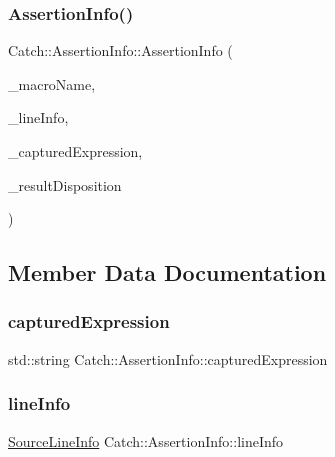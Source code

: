 \subsubsection{\texorpdfstring{Assertion\+Info()}{AssertionInfo()}\hspace{0.1cm}{\footnotesize\ttfamily [2/2]}}
{\footnotesize\ttfamily Catch\+::\+Assertion\+Info\+::\+Assertion\+Info (\begin{DoxyParamCaption}\item[{std\+::string const \&}]{\+\_\+macro\+Name,  }\item[{\hyperlink{struct_catch_1_1_source_line_info}{Source\+Line\+Info} const \&}]{\+\_\+line\+Info,  }\item[{std\+::string const \&}]{\+\_\+captured\+Expression,  }\item[{\hyperlink{struct_catch_1_1_result_disposition_a3396cad6e2259af326b3aae93e23e9d8}{Result\+Disposition\+::\+Flags}}]{\+\_\+result\+Disposition }\end{DoxyParamCaption})}



\subsection{Member Data Documentation}
\hypertarget{struct_catch_1_1_assertion_info_af7c1d3cbfa346e9a303030fa0ef0cb54}{}\label{struct_catch_1_1_assertion_info_af7c1d3cbfa346e9a303030fa0ef0cb54} 
\subsubsection{\texorpdfstring{captured\+Expression}{capturedExpression}}
{\footnotesize\ttfamily std\+::string Catch\+::\+Assertion\+Info\+::captured\+Expression}

\hypertarget{struct_catch_1_1_assertion_info_a17bdbb404ba12658034f833be2f4c3e7}{}\label{struct_catch_1_1_assertion_info_a17bdbb404ba12658034f833be2f4c3e7} 
\subsubsection{\texorpdfstring{line\+Info}{lineInfo}}
{\footnotesize\ttfamily \hyperlink{struct_catch_1_1_source_line_info}{Source\+Line\+Info} Catch\+::\+Assertion\+Info\+::line\+Info}

